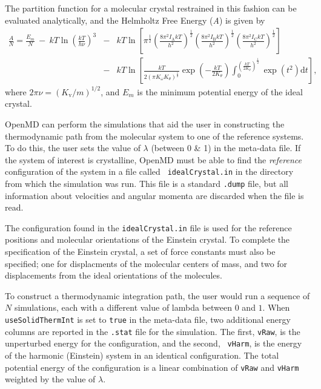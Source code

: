 \documentclass[]{book}
\begin{document}
The partition function for a molecular crystal restrained in this
fashion can be evaluated analytically, and the Helmholtz Free Energy
({\it A}) is given by
\begin{eqnarray}
\frac{A}{N} = \frac{E_m}{N}\ -\ kT\ln \left (\frac{kT}{h\nu}\right )^3&-&kT\ln \left
[\pi^\frac{1}{2}\left (\frac{8\pi^2I_\mathrm{A}kT}{h^2}\right
)^\frac{1}{2}\left (\frac{8\pi^2I_\mathrm{B}kT}{h^2}\right
)^\frac{1}{2}\left (\frac{8\pi^2I_\mathrm{C}kT}{h^2}\right
)^\frac{1}{2}\right ] \nonumber \\ &-& kT\ln \left [\frac{kT}{2(\pi
K_\omega K_\theta)^{\frac{1}{2}}}\exp\left
(-\frac{kT}{2K_\theta}\right)\int_0^{\left (\frac{kT}{2K_\theta}\right
)^\frac{1}{2}}\exp(t^2)\mathrm{d}t\right ],
\label{ecFreeEnergy}
\end{eqnarray}
where $2\pi\nu = (K_\mathrm{v}/m)^{1/2}$, and $E_m$ is the minimum
potential energy of the ideal crystal.\cite{Baez95a} 

{\sc OpenMD} can perform the simulations that aid the user in
constructing the thermodynamic path from the molecular system to one
of the reference systems.  To do this, the user sets the value of
$\lambda$ (between 0 \& 1) in the meta-data file.  If the system of
interest is crystalline, {\sc OpenMD} must be able to find the  {\it
reference} configuration of the system in a file called {\tt
idealCrystal.in} in the directory from which the simulation was run.
This file is a standard {\tt .dump} file, but all information about
velocities and angular momenta are discarded when the file is read. 

The configuration found in the {\tt idealCrystal.in} file is used for 
the reference positions and molecular orientations of the Einstein
crystal.  To complete the specification of the Einstein crystal, a set
of force constants must also be specified; one for displacments of the
molecular centers of mass, and two for displacements from the ideal
orientations of the molecules.  

To construct a thermodynamic integration path, the user would run a
sequence of $N$ simulations, each with a different value of lambda
between $0$ and $1$.  When {\tt useSolidThermInt} is set to {\tt true}
in the meta-data file, two additional energy columns are reported in
the {\tt .stat} file for the simulation.  The first, {\tt vRaw}, is
the unperturbed energy for the configuration, and the second, {\tt
vHarm}, is the energy of the harmonic (Einstein) system in an
identical configuration.   The total potential energy of the
configuration is a linear combination of {\tt vRaw} and {\tt vHarm}
weighted by the value of $\lambda$.
\end{document}
